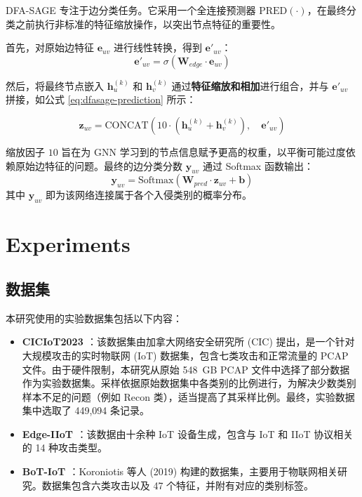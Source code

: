 \documentclass{article}
\begin{document}
DFA-SAGE 专注于边分类任务。它采用一个全连接预测器 $\text{PRED}(\cdot)$，在最终分类之前执行非标准的特征缩放操作，以突出节点特征的重要性。

首先，对原始边特征 $\mathbf{e}_{uv}$ 进行线性转换，得到 $\mathbf{e}'_{uv}$：
\begin{equation}
\mathbf{e}'_{uv} = \sigma(\mathbf{W}_{edge} \cdot \mathbf{e}_{uv})
\end{equation}

然后，将最终节点嵌入 $\mathbf{h}_u^{(k)}$ 和 $\mathbf{h}_v^{(k)}$ 通过\textbf{特征缩放和相加}进行组合，并与 $\mathbf{e}'_{uv}$ 拼接，如公式 \eqref{eq:dfasage-prediction} 所示：

\begin{equation}
\mathbf{z}_{uv} = \text{CONCAT} \left( 10 \cdot (\mathbf{h}_u^{(k)} + \mathbf{h}_v^{(k)}), \quad \mathbf{e}'_{uv} \right)
\label{eq:dfasage-prediction}
\end{equation}

缩放因子 $10$ 旨在为 GNN 学习到的节点信息赋予更高的权重，以平衡可能过度依赖原始边特征的问题。最终的边分类分数 $\mathbf{y}_{uv}$ 通过 Softmax 函数输出：
$$
\mathbf{y}_{uv} = \text{Softmax} \left( \mathbf{W}_{pred} \cdot \mathbf{z}_{uv} + \mathbf{b} \right)
$$
其中 $\mathbf{y}_{uv}$ 即为该网络连接属于各个入侵类别的概率分布。

\section{Experiments}

\subsection{数据集}

本研究使用的实验数据集包括以下内容：

\begin{itemize}
    \item \textbf{CICIoT2023 \cite{202305.0443}}：该数据集由加拿大网络安全研究所 (CIC) 提出，是一个针对大规模攻击的实时物联网 (IoT) 数据集，包含七类攻击和正常流量的 PCAP 文件。由于硬件限制，本研究从原始 548~GB PCAP 文件中选择了部分数据作为实验数据集。采样依据原始数据集中各类别的比例进行，为解决少数类别样本不足的问题（例如 Recon 类），适当提高了其采样比例。最终，实验数据集中选取了 449,094 条记录。

    \item \textbf{Edge-IIoT \cite{9751703}}：该数据由十余种 IoT 设备生成，包含与 IoT 和 IIoT 协议相关的 14 种攻击类型。

    \item \textbf{BoT-IoT \cite{KORONIOTIS2019779}}：Koroniotis 等人 (2019) 构建的数据集，主要用于物联网相关研究。数据集包含六类攻击以及 47 个特征，并附有对应的类别标签。
\end{itemize}
\end{document}
